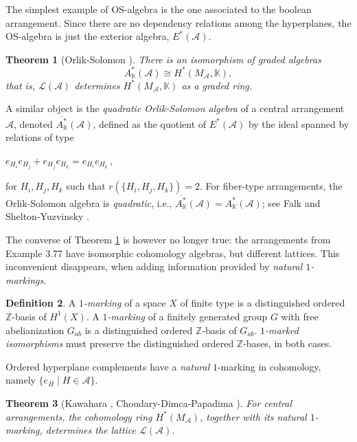 \documentclass[psamsfonts]{conm-p-l}
\newtheorem{theorem}{Theorem}[section]
\theoremstyle{definition}
\newtheorem{definition}[theorem]{Definition}
\theoremstyle{remark}
\numberwithin{equation}{section}
\newcommand{\A}{{\mathcal A}}
\newcommand{\Z}{\mathbb{Z}}
\newcommand{\K}{\mathbb{K}}
\begin{document}
 The simplest example of OS-algebra is the one associated to the boolean arrangement. Since 
 there are no dependency relations among the hyperplanes,  the OS-algebra 
 is just the exterior algebra, $E^*(\A)$.
 
 \begin{theorem}[Orlik-Solomon \cite{OS}]
 \label{thm:OS}
 There is an isomorphism of graded algebras
 \begin{equation}
 A_{\mathbb{K}}^*(\A) \cong H^*(M_{\A}, \mathbb{K}),
 \end{equation}
 that is, $\mathcal L(\A)$ determines $H^*(M_{\A}, \mathbb{K})$ as a graded ring. 
\end{theorem}
 
 A similar object is the {\it quadratic Orlik-Solomon algebra} of a central arrangement 
 $\A$,  denoted $\overline{A^*_{\K}}(\A)$, defined as the  quotient of $E^*(\A)$ 
 by the ideal spanned by relations of type
\begin{center}
 $e_{H_{i}}e_{H_{j}}+e_{H_{j}}e_{H_{k}}=e_{H_{i}}e_{H_{k}}\, ,$
\end{center}
for $H_{i},H_{j},H_{k}$ such that $r(\{H_{i},H_{j},H_{k}\})=2$.
For  fiber-type arrangements, the Orlik-Solomon algebra 
is {\it quadratic}, i.e., $\overline{A^*_{\K}}(\A)=A^*_{\K}(\A)$; see Falk \cite{Fa1}
and Shelton-Yuzvinsky \cite{SY}.

  The converse of Theorem \ref{thm:OS} is however no longer true:
  the arrangements from Example 3.77 \cite{OT} have isomorphic cohomology algebras, but
  different lattices. This inconvenient disappears, when adding information provided by
  {\it natural $1$-markings}. 
  
\begin{definition}
\label{1mrk}
A {\em $1$-marking} of a space $X$ of finite type is a distinguished ordered $\Z$-basis of $H^1(X)$.
A {\em $1$-marking} of a finitely generated group $G$ with free abelianization 
$G_{ab}$ is a distinguished ordered 
$\Z$-basis of $G_{ab}$. {\em $1$-marked isomorphisms} must preserve the 
distinguished ordered $\Z$-bases, in both cases.
\end{definition}

Ordered hyperplane complements have a {\em natural} $1$-marking in cohomology, namely
$\{ e_H \mid H\in \A \}$.

\begin{theorem}[Kawahara \cite{K}, Choudary-Dimca-Papadima \cite{CDP}]
\label{thm:1m}
For central arrangements, the cohomology ring $H^*(M_{\A})$, together with its natural $1$-marking,
determines the lattice $\mathcal L(\A)$.
\end{theorem}
\end{document}
